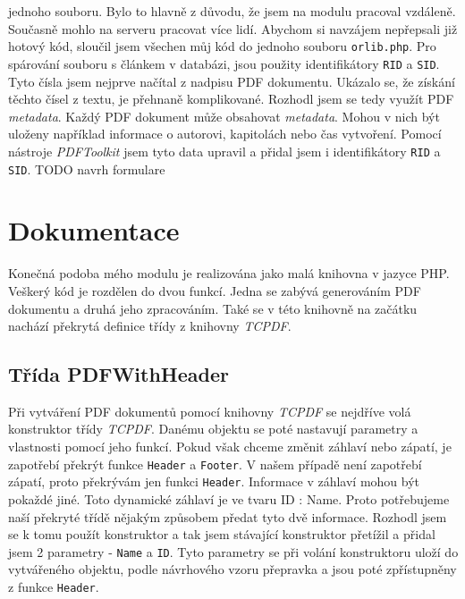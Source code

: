 \documentclass[czech,BP]{thesiskiv}
\begin{document}
jednoho souboru. Bylo to hlavně z důvodu, že jsem na modulu pracoval vzdáleně. Současně mohlo na serveru pracovat více lidí. Abychom si navzájem nepřepsali již hotový kód, sloučil jsem všechen můj kód do jednoho souboru \texttt{orlib.php}. Pro spárování souboru s článkem v databázi, jsou použity identifikátory \texttt{RID} a \texttt{SID}. Tyto čísla jsem nejprve načítal z nadpisu PDF dokumentu. Ukázalo se, že získání těchto čísel z textu, je přehnaně komplikované. Rozhodl jsem se tedy využít PDF \emph{metadata}. Každý PDF dokument může obsahovat \emph{metadata}. Mohou v nich být uloženy například informace o autorovi, kapitolách nebo čas vytvoření. Pomocí nástroje \emph{PDFToolkit} jsem tyto data upravil a přidal jsem i identifikátory \texttt{RID} a \texttt{SID}.
TODO navrh formulare
\chapter{Dokumentace}
Konečná podoba mého modulu je realizována jako malá knihovna v jazyce PHP. Veškerý kód je rozdělen do dvou funkcí. Jedna se zabývá generováním PDF dokumentu a druhá jeho zpracováním. Také se v této knihovně na začátku nachází překrytá definice třídy z knihovny \emph{TCPDF}. 
\section{Třída PDFWithHeader}
Při vytváření PDF dokumentů pomocí knihovny \emph{TCPDF} se nejdříve volá konstruktor třídy \emph{TCPDF}. Danému objektu se poté nastavují parametry a vlastnosti pomocí jeho funkcí. Pokud však chceme změnit záhlaví nebo zápatí, je zapotřebí překrýt funkce \texttt{Header} a \texttt{Footer}. V našem případě není zapotřebí zápatí, proto překrývám jen funkci \texttt{Header}. Informace v záhlaví mohou být pokaždé jiné. Toto dynamické záhlaví je ve tvaru ID : Name. Proto potřebujeme naší překryté třídě nějakým způsobem předat tyto dvě informace. Rozhodl jsem se k tomu použít konstruktor a tak jsem stávající konstruktor přetížil a přidal jsem 2 parametry - \texttt{Name} a \texttt{ID}. Tyto parametry se při volání konstruktoru uloží do vytvářeného objektu, podle návrhového vzoru přepravka a jsou poté zpřístupněny z funkce \texttt{Header}.
\end{document}
